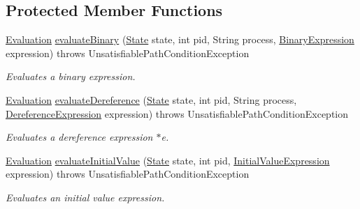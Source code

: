 \subsection*{Protected Member Functions}
\begin{DoxyCompactItemize}
\item 
\hyperlink{classedu_1_1udel_1_1cis_1_1vsl_1_1civl_1_1semantics_1_1IF_1_1Evaluation}{Evaluation} \hyperlink{classedu_1_1udel_1_1cis_1_1vsl_1_1civl_1_1semantics_1_1common_1_1CommonEvaluator_a9a718fd0659d2a50bb4c16c737b97c5b}{evaluate\+Binary} (\hyperlink{interfaceedu_1_1udel_1_1cis_1_1vsl_1_1civl_1_1state_1_1IF_1_1State}{State} state, int pid, String process, \hyperlink{interfaceedu_1_1udel_1_1cis_1_1vsl_1_1civl_1_1model_1_1IF_1_1expression_1_1BinaryExpression}{Binary\+Expression} expression)  throws Unsatisfiable\+Path\+Condition\+Exception 
\begin{DoxyCompactList}\small\item\em Evaluates a binary expression. \end{DoxyCompactList}\item 
\hyperlink{classedu_1_1udel_1_1cis_1_1vsl_1_1civl_1_1semantics_1_1IF_1_1Evaluation}{Evaluation} \hyperlink{classedu_1_1udel_1_1cis_1_1vsl_1_1civl_1_1semantics_1_1common_1_1CommonEvaluator_a4edbf5ff373e39c5b9da1095c1d09386}{evaluate\+Dereference} (\hyperlink{interfaceedu_1_1udel_1_1cis_1_1vsl_1_1civl_1_1state_1_1IF_1_1State}{State} state, int pid, String process, \hyperlink{interfaceedu_1_1udel_1_1cis_1_1vsl_1_1civl_1_1model_1_1IF_1_1expression_1_1DereferenceExpression}{Dereference\+Expression} expression)  throws Unsatisfiable\+Path\+Condition\+Exception 
\begin{DoxyCompactList}\small\item\em Evaluates a dereference expression {\ttfamily $\ast$e}. \end{DoxyCompactList}\item 
\hyperlink{classedu_1_1udel_1_1cis_1_1vsl_1_1civl_1_1semantics_1_1IF_1_1Evaluation}{Evaluation} \hyperlink{classedu_1_1udel_1_1cis_1_1vsl_1_1civl_1_1semantics_1_1common_1_1CommonEvaluator_a17f1c6bee858374c5142a8bfc378686b}{evaluate\+Initial\+Value} (\hyperlink{interfaceedu_1_1udel_1_1cis_1_1vsl_1_1civl_1_1state_1_1IF_1_1State}{State} state, int pid, \hyperlink{interfaceedu_1_1udel_1_1cis_1_1vsl_1_1civl_1_1model_1_1IF_1_1expression_1_1InitialValueExpression}{Initial\+Value\+Expression} expression)  throws Unsatisfiable\+Path\+Condition\+Exception 
\begin{DoxyCompactList}\small\item\em Evaluates an initial value expression. \end{DoxyCompactList}\item 

\end{DoxyCompactItemize}
